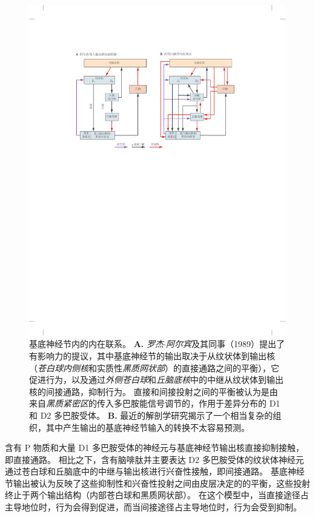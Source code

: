 \begin{figure}[htbp]
	\centering
	\includegraphics[width=1.0\linewidth]{chap38/fig_38_3}
	\caption{基底神经节内的内在联系。
		\textbf{A.} \textit{罗杰$\cdot$阿尔宾}及其同事（1989）提出了有影响力的提议，其中基底神经节的输出取决于从纹状体到输出核（\textit{苍白球内侧核}和实质性\textit{黑质网状部}）的直接通路之间的平衡），它促进行为，以及通过\textit{外侧苍白球}和\textit{丘脑底核}中的中继从纹状体到输出核的间接通路，抑制行为。
		直接和间接投射之间的平衡被认为是由来自\textit{黑质紧密区}的传入多巴胺能信号调节的，作用于差异分布的 D1 和 D2 多巴胺受体。
		\textbf{B.} 最近的解剖学研究揭示了一个相当复杂的组织，其中产生输出的基底神经节输入的转换不太容易预测。}
	\label{fig:38_3}
\end{figure}


含有 P 物质和大量 D1 多巴胺受体的神经元与基底神经节输出核直接抑制接触，即直接通路。
相比之下，含有脑啡肽并主要表达 D2 多巴胺受体的纹状体神经元通过苍白球和丘脑底中的中继与输出核进行兴奋性接触，即间接通路。
基底神经节输出被认为反映了这些抑制性和兴奋性投射之间由皮层决定的的平衡，这些投射终止于两个输出结构（内部苍白球和黑质网状部）。
在这个模型中，当直接途径占主导地位时，行为会得到促进，而当间接途径占主导地位时，行为会受到抑制。



